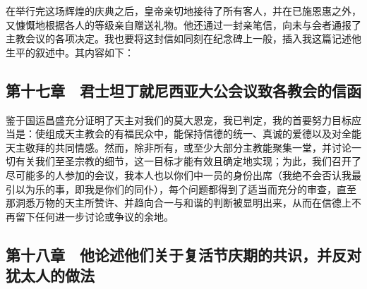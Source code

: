 在举行完这场辉煌的庆典之后，皇帝亲切地接待了所有客人，并在已施恩惠之外，又慷慨地根据各人的等级亲自赠送礼物。他还通过一封亲笔信，向未与会者通报了主教会议的各项决定。我也要将这封信如同刻在纪念碑上一般，插入我这篇记述他生平的叙述中。其内容如下：\par


\subsection{第十七章　君士坦丁就尼西亚大公会议致各教会的信函}

\par

鉴于国运昌盛充分证明了天主对我们的莫大恩宠，我已判定，我的首要努力目标应当是：使组成天主教会的有福民众中，能保持信德的统一、真诚的爱德以及对全能天主敬拜的共同情感。然而，除非所有，或至少大部分主教能聚集一堂，并讨论一切有关我们至圣宗教的细节，这一目标才能有效且确定地实现；为此，我们召开了尽可能多的人参加的会议，我本人也以你们中一员的身份出席（我绝不会否认我最引以为乐的事，即我是你们的同仆），每个问题都得到了适当而充分的审查，直至那洞悉万物的天主所赞许、并趋向合一与和谐的判断被显明出来，从而在信德上不再留下任何进一步讨论或争议的余地。\par


\subsection{第十八章　他论述他们关于复活节庆期的共识，并反对犹太人的做法}

